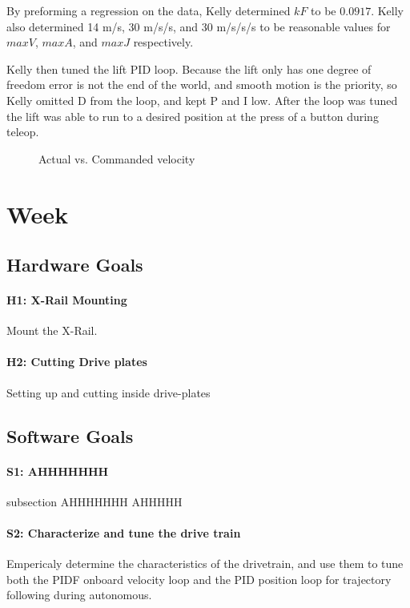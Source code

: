 \documentclass{article}
\begin{document}
By preforming a regression on the data, Kelly determined $kF$ to be $0.0917$. Kelly also determined 14 m/s, 30 m/s/s, and 30 m/s/s/s to be reasonable values for $maxV$, $maxA$, and $maxJ$ respectively.

Kelly then tuned the lift PID loop. Because the lift only has one degree of freedom error is not the end of the world, and smooth motion is the priority, so Kelly omitted D from the loop, and kept P and I low. After the loop was tuned the lift was able to run to a desired position at the press of a button during teleop.

\begin {figure}
\centering
{}
\caption {Actual vs. Commanded velocity}
\label {fig:graph}
\end{figure}
\clearpage \newpage \section{Week \thesection} 
\subsection{Hardware Goals}
\paragraph{H1: X-Rail Mounting}
 Mount the X-Rail.
\paragraph{H2: Cutting Drive plates}
Setting up and cutting inside drive-plates
\subsection{Software Goals}
\paragraph{S1: AHHHHHHH}
subsection {AHHHHHHH}
AHHHHH

\paragraph{S2: Characterize and tune the drive train}
 Empericaly determine the characteristics of the drivetrain, and use them to tune both the PIDF onboard velocity loop and the PID position loop for trajectory following during autonomous. 
\newpage
\end{document}
